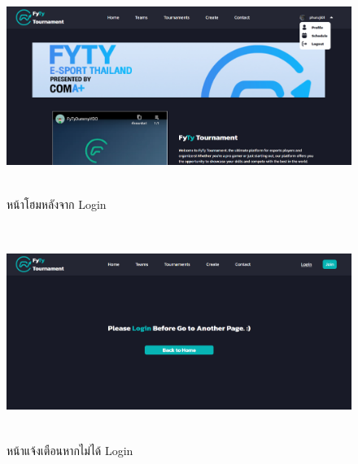     \begin{figure}[ht]
      \begin{center}
      \includegraphics[width=18cm,height=7cm,keepaspectratio]{home_full.png}
      \end{center}
      \caption[หน้าโฮมหลังจาก Login]{หน้าโฮมหลังจาก Login}
      \label{fig:หน้าโฮมหลังจาก Login}
    \end{figure}
    \begin{figure}[ht]
      \begin{center}
      \includegraphics[width=18cm,height=7cm,keepaspectratio]{un_auth.png}
      \end{center}
      \caption[หน้าแจ้งเตือนหากไม่ได้ Login]{หน้าแจ้งเตือนหากไม่ได้ Login}
      \label{fig:หน้าแจ้งเตือนหากไม่ได้ Login}
    \end{figure}

